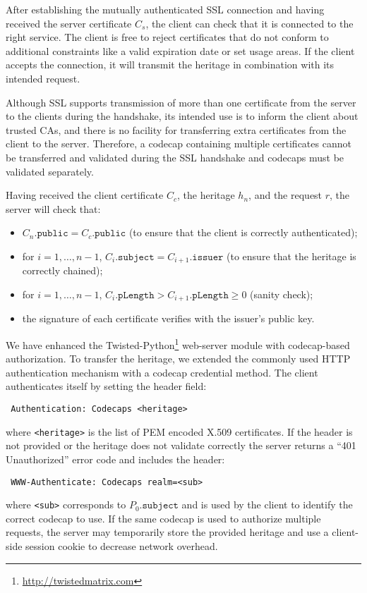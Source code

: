 \documentclass[10pt, conference, compsocconf]{IEEEtran}
\begin{document}
After establishing the mutually authenticated SSL connection and
having received the server certificate $C_s$, the client can check
that it is connected to the right service.
The client is free to reject certificates that
do not conform to additional constraints like a valid expiration
date or set usage areas.  If the client accepts the connection, it
will transmit the heritage in combination with its intended request.

Although SSL supports transmission of more than one
certificate from the server to the clients during the handshake,
its intended use is to inform the client about trusted CAs,
and there is no facility for transferring extra certificates
from the client to the server.  Therefore, a codecap containing
multiple certificates cannot be transferred and validated during
the SSL handshake and codecaps must be validated separately.

Having received the client certificate $C_c$, the heritage $h_n$,
and the request $r$, the server will check that:

\begin{itemize}
\item $C_n.\texttt{public} = C_c.\texttt{public}$ (to ensure that
the client is correctly authenticated);

\item for $i = 1,\ldots,n-1$, $C_i.\texttt{subject} = C_{i+1}.\texttt{issuer}$
(to ensure that the heritage is correctly chained);

\item for $i = 1,\ldots,n-1$, $C_i.\texttt{pLength} > C_{i+1}.\texttt{pLength} \geq 0$
(sanity check);

\item the signature of each certificate verifies with the issuer's public key.

\end{itemize}


We have enhanced the Twisted-Python\footnote{\url{http://twistedmatrix.com}}
web-server module with codecap-based authorization.
To transfer the heritage, we extended the commonly used HTTP authentication
mechanism with a codecap credential method.
The client authenticates itself by setting the header field:
\begin{verbatim}
 Authentication: Codecaps <heritage>
\end{verbatim}
where \texttt{<heritage>} is the list of PEM encoded X.509 certificates.
If the header is not provided or the heritage does not validate correctly the server returns a ``401 Unauthorized'' error code and includes the header:
\begin{verbatim}
 WWW-Authenticate: Codecaps realm=<sub> 
\end{verbatim}
where \texttt{<sub>} corresponds to $P_0.\texttt{subject}$ and
is used by the client to identify the correct codecap to use.  If
the same codecap is used to authorize multiple requests, the server
may temporarily store the provided heritage and use a client-side
session cookie to decrease network overhead.
\end{document}
